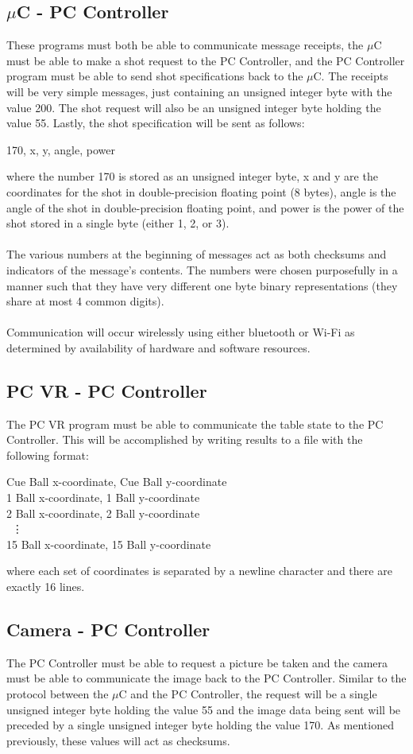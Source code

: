 \documentclass[titlepage]{article}
\begin{document}
\subsection{$\mu$C - PC Controller}
These programs must both be able to communicate message receipts, the $\mu$C must be able to make a shot request to the PC Controller, and the PC Controller program must be able to send shot specifications back to the $\mu$C. The receipts will be very simple messages, just containing an unsigned integer byte with the value 200. The shot request will also be an unsigned integer byte holding the value 55. Lastly, the shot specification will be sent as follows:
\begin{center}
	170, x, y, angle, power
\end{center}
where the number 170 is stored as an unsigned integer byte, x and y are the coordinates for the shot in double-precision floating point (8 bytes), angle is the angle of the shot in double-precision floating point, and power is the power of the shot stored in a single byte (either 1, 2, or 3).\\\\
The various numbers at the beginning of messages act as both checksums and indicators of the message's contents. The numbers were chosen purposefully in a manner such that they have very different one byte binary representations (they share at most 4 common digits).\\\\
Communication will occur wirelessly using either bluetooth or Wi-Fi as determined by availability of hardware and software resources.
\subsection{PC VR - PC Controller}
The PC VR program must be able to communicate the table state to the PC Controller. This will be accomplished by writing results to a file with the following format:
\begin{center}
	Cue Ball x-coordinate, Cue Ball y-coordinate\\
	1 Ball x-coordinate, 1 Ball y-coordinate\\
	2 Ball x-coordinate, 2 Ball y-coordinate\\
	~\vdots\\
	15 Ball x-coordinate, 15 Ball y-coordinate
\end{center}
where each set of coordinates is separated by a newline character and there are exactly 16 lines.
\subsection{Camera - PC Controller}
The PC Controller must be able to request a picture be taken and the camera must be able to communicate the image back to the PC Controller. Similar to the protocol between the $\mu$C and the PC Controller, the request will be a single unsigned integer byte holding the value 55 and the image data being sent will be preceded by a single unsigned integer byte holding the value 170. As mentioned previously, these values will act as checksums.
\end{document}
